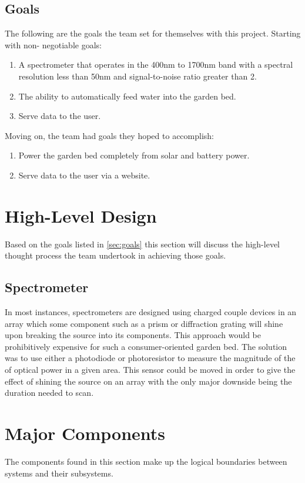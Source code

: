 \documentclass[journal]{IEEEtran}
\begin{document}
\subsection{Goals} \label{sec:goals}
The following are the goals the team set for themselves with this project. Starting with non-
negotiable goals:
\begin{enumerate}
   \item A spectrometer that operates in the 400nm to 1700nm band with a spectral resolution less
         than 50nm and signal-to-noise ratio greater than 2.
   \item The ability to automatically feed water into the garden bed.
   \item Serve data to the user.
\end{enumerate}
Moving on, the team had goals they hoped to accomplish:
\begin{enumerate}
   \item Power the garden bed completely from solar and battery power.
   \item Serve data to the user via a website.
\end{enumerate}
\section{High-Level Design}
Based on the goals listed in \autoref{sec:goals} this section will discuss the high-level thought
process the team undertook in achieving those goals.
\subsection{Spectrometer} 
In most instances, spectrometers are designed using charged couple devices in an array which some
component such as a prism or diffraction grating will shine upon breaking the source into its
components. This approach would be prohibitively expensive for such a consumer-oriented garden
bed. The solution was to use either a photodiode or photoresistor to measure the magnitude of the
of optical power in a given area. This sensor could be moved in order to give the effect of shining
the source on an array with the only major downside being the duration needed to scan. 
\section{Major Components} \label{sec:major-components}
The components found in this section make up the logical boundaries between systems and their
subsystems. 
\end{document}

